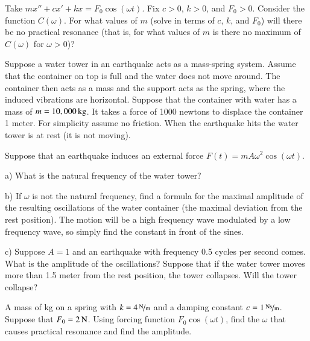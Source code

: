 \documentclass[12pt]{book}
\begin{document}
\begin{exercise}
Take $m x'' + c x' + kx = F_0 \cos (\omega t)$.
Fix $c > 0$, $k > 0$, and $F_0 > 0$.  Consider the function $C(\omega)$.
For what values of $m$ (solve in terms of $c$, $k$, and $F_0$) will there be no
practical resonance (that is, for what values of $m$ is there no maximum of
$C(\omega)$ for $\omega > 0$)?
\end{exercise}

\begin{exercise}
Suppose a water tower in an earthquake acts as a mass-spring system.
Assume that the container on top is full and the water does not move around.
The container then acts as a mass and the support acts as the spring, where
the induced vibrations are horizontal.  Suppose that the container with water
has a mass of $m=\unit[10,000]{kg}$.  It takes a force of 1000 newtons to displace 
the container 1 meter.  For simplicity assume no friction.
When the earthquake hits the water tower is at rest (it is not moving).

Suppose that an earthquake induces an external force 
$F(t) = m A \omega^2 \cos (\omega t)$.

a) What is the natural frequency of the water tower?

b) If $\omega$ is not the natural frequency, find a formula for the maximal
amplitude of the resulting oscillations of the water container (the maximal
deviation from the rest position).  The motion will be a high frequency wave
modulated by a low frequency wave, so simply find the constant in front of the
sines.

c) Suppose $A = 1$ and an earthquake with frequency 0.5 cycles per second
comes.  What is the amplitude of the oscillations?  Suppose that if the water
tower moves more than 1.5 meter from the rest position, the tower collapses.  Will the tower collapse?
\end{exercise}

\setcounter{exercise}{100}

\begin{exercise}
A mass of \unit[4]{kg} on a spring with $k=\unitfrac[4]{N}{m}$ and a damping
constant $c=\unitfrac[1]{Ns}{m}$.
Suppose that $F_0 = \unit[2]{N}$.  Using forcing function $F_0 \cos (\omega t)$,
find the $\omega$ that causes practical resonance and find the amplitude.
\end{exercise}
\end{document}
